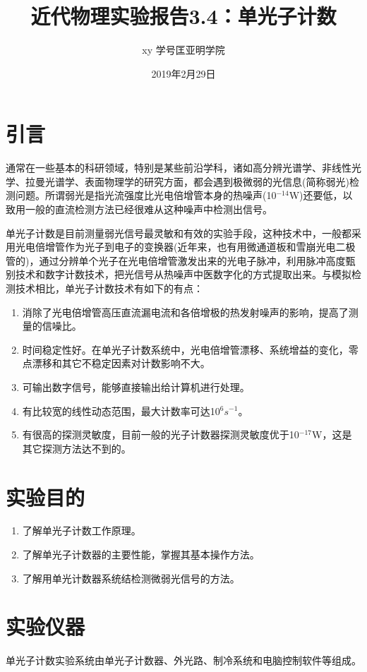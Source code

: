 \documentclass[a4paper]{article}
\title{近代物理实验报告3.4：单光子计数}
\author{xy
\quad 学号\quad 匡亚明学院}
\date{2019年2月29日}
\begin{document}
\maketitle


\section{引言}
通常在一些基本的科研领域，特别是某些前沿学科，诸如高分辨光谱学、非线性光学、拉曼光谱学、表面物理学的研究方面，都会遇到极微弱的光信息(简称弱光)检测问题。所谓弱光是指光流强度比光电倍增管本身的热噪声(10$^{-14}$W)还要低，以致用一般的直流检测方法已经很难从这种噪声中检测出信号。

单光子计数是目前测量弱光信号最灵敏和有效的实验手段，这种技术中，一般都采用光电倍增管作为光子到电子的变换器(近年来，也有用微通道板和雪崩光电二极管的)，通过分辨单个光子在光电倍增管激发出来的光电子脉冲，利用脉冲高度甄别技术和数字计数技术，把光信号从热噪声中医数字化的方式提取出来。与模拟检测技术相比，单光子计数技术有如下的有点：
\begin{enumerate}
\item 消除了光电倍增管高压直流漏电流和各倍增极的热发射噪声的影响，提高了测量的信噪比。
\item 时间稳定性好。在单光子计数系统中，光电倍增管漂移、系统增益的变化，零点漂移和其它不稳定因素对计数影响不大。
\item 可输出数字信号，能够直接输出给计算机进行处理。
\item 有比较宽的线性动态范围，最大计数率可达10$^6s^{-1}$。
\item 有很高的探测灵敏度，目前一般的光子计数器探测灵敏度优于10$^{-17}$W，这是其它探测方法达不到的。
\end{enumerate}

\section{实验目的}
\begin{enumerate}
\item 了解单光子计数工作原理。
\item 了解单光子计数器的主要性能，掌握其基本操作方法。
\item 了解用单光计数器系统结检测微弱光信号的方法。
\end{enumerate}

\section{实验仪器}
单光子计数实验系统由单光子计数器、外光路、制冷系统和电脑控制软件等组成。
\end{document}
